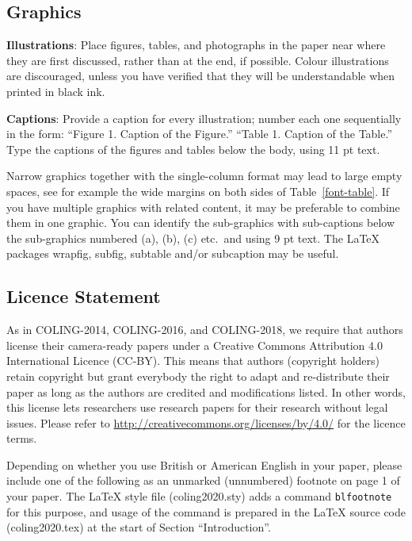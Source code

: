 \documentclass[11pt]{article}
\begin{document}
\subsection{Graphics}

{\bf Illustrations}: Place figures, tables, and photographs in the
paper near where they are first discussed, rather than at the end, if
possible. 
Colour
illustrations are discouraged, unless you have verified that  
they will be understandable when printed in black ink.

{\bf Captions}: Provide a caption for every illustration; number each one
sequentially in the form:  ``Figure 1. Caption of the Figure.'' ``Table 1.
Caption of the Table.''  Type the captions of the figures and 
tables below the body, using 11 pt text.

Narrow graphics together with the single-column format may lead to
large empty spaces,
see for example the wide margins on both sides of Table~\ref{font-table}.
If you have multiple graphics with related content, it may be
preferable to combine them in one graphic.
You can identify the sub-graphics with sub-captions below the
sub-graphics numbered (a), (b), (c) etc.\ and using 9 pt text.
The \LaTeX{} packages wrapfig, subfig, subtable and/or subcaption
may be useful.


\subsection{Licence Statement}
\label{licence}

As in COLING-2014, COLING-2016, and COLING-2018,
we require that authors license their
camera-ready papers under a
Creative Commons Attribution 4.0 International Licence
(CC-BY).
This means that authors (copyright holders) retain copyright but
grant everybody 
the right to adapt and re-distribute their paper 
as long as the authors are credited and modifications listed.
In other words, this license lets researchers use research papers for their research without legal issues.
Please refer to 
\url{http://creativecommons.org/licenses/by/4.0/} for the
licence terms.  

Depending on whether you use British or American English in your
paper, please include one of the following as an unmarked
(unnumbered) footnote on page 1 of your paper.
The \LaTeX{} style file (coling2020.sty) adds a command
\texttt{blfootnote} for this purpose, and usage of the command is
prepared in the \LaTeX{} source code (coling2020.tex) at the start
of Section ``Introduction''.
\end{document}
